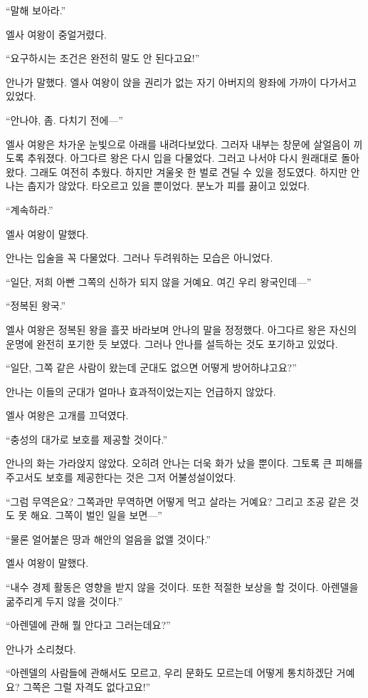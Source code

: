 ``말해 보아라.''

엘사 여왕이 중얼거렸다.

``요구하시는 조건은 완전히 말도 안 된다고요!''

안나가 말했다. 엘사 여왕이 앉을 권리가 없는 자기 아버지의 왕좌에 가까이 다가서고 있었다.

``안나야, 좀. 다치기 전에—''

엘사 여왕은 차가운 눈빛으로 아래를 내려다보았다. 그러자 내부는 창문에 살얼음이 끼도록 추워졌다. 아그다르 왕은 다시 입을 다물었다. 그러고 나서야 다시 원래대로 돌아왔다. 그래도 여전히 추웠다. 하지만 겨울옷 한 벌로 견딜 수 있을 정도였다. 하지만 안나는 춥지가 않았다. 타오르고 있을 뿐이었다. 분노가 피를 끓이고 있었다.

``계속하라.''

엘사 여왕이 말했다.

안나는 입술을 꼭 다물었다. 그러나 두려워하는 모습은 아니었다.

``일단, 저희 아빤 그쪽의 신하가 되지 않을 거예요. 여긴 우리 왕국인데—''

``정복된 왕국.''

엘사 여왕은 정복된 왕을 흘끗 바라보며 안나의 말을 정정했다. 아그다르 왕은 자신의 운명에 완전히 포기한 듯 보였다. 그러나 안나를 설득하는 것도 포기하고 있었다.

``일단, 그쪽 같은 사람이 왔는데 군대도 없으면 어떻게 방어하냐고요?''

안나는 이들의 군대가 얼마나 효과적이었는지는 언급하지 않았다.

엘사 여왕은 고개를 끄덕였다.

``충성의 대가로 보호를 제공할 것이다.''

안나의 화는 가라앉지 않았다. 오히려 안나는 더욱 화가 났을 뿐이다. 그토록 큰 피해를 주고서도 보호를 제공한다는 것은 그저 어불성설이었다.

``그럼 무역은요? 그쪽과만 무역하면 어떻게 먹고 살라는 거예요? 그리고 조공 같은 것도 못 해요. 그쪽이 벌인 일을 보면—''

``물론 얼어붙은 땅과 해안의 얼음을 없앨 것이다.''

엘사 여왕이 말했다.

``내수 경제 활동은 영향을 받지 않을 것이다. 또한 적절한 보상을 할 것이다. 아렌델을 굶주리게 두지 않을 것이다.''

``아렌델에 관해 뭘 안다고 그러는데요?''

안나가 소리쳤다.

``아렌델의 사람들에 관해서도 모르고, 우리 문화도 모르는데 어떻게 통치하겠단 거예요? 그쪽은 그럴 자격도 없다고요!''

